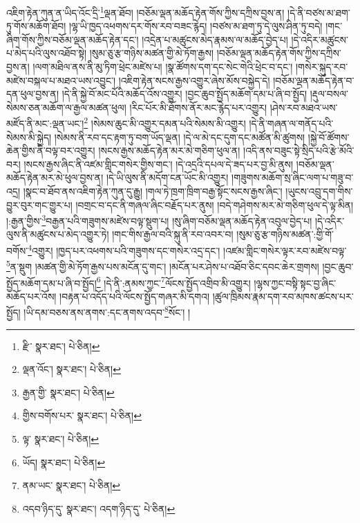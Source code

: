 འཇིག་རྟེན་ཀུན་ན་ཡིད་འོང་དྲི་\footnote{རྫི་  སྣར་ཐང་།  པེ་ཅིན། }ལྡན་ཐོབ། །བཅོམ་ལྡན་མཆོད་རྟེན་གོས་ཀྱིས་དཀྲིས་བྱས་ན། །དེ་ནི་བཙས་མ་ཐག་ཏུ་གོས་མཆོག་ཐོབ། །ལྷ་ཡི་ཁྱད་འཕགས་དར་གོས་རབ་བཟང་རྙེད། །བཙས་མ་ཐག་ཏུ་དེ་ལུས་ཤིན་ཏུ་བདེ། །གང་ཞིག་གོས་ཀྱིས་བཅོམ་ལྡན་མཆོད་རྟེན་དང་། །འདྲེན་པ་མཚུངས་མེད་རྣམས་ལ་མཆོད་བྱེད་པ། །དེ་འདིར་མཚུངས་པ་མེད་པའི་ལུས་འཐོབ་སྟེ། །སུམ་ཅུ་རྩ་གཉིས་མཚན་གྱི་མེ་ཏོག་རྒྱས། །བཅོམ་ལྡན་མཆོད་རྟེན་གོས་ཀྱིས་དཀྲིས་བྱས་ན། །ལག་མཐིལ་ནས་ནི་མུ་ཏིག་ཕྲེང་མཛེས་པ། །སྣ་ཚོགས་དག་དང་སེང་གེའི་ཕྲེང་བ་དང་། །གསེར་སྐུད་རབ་མཛེས་བསྐལ་པ་མཐའ་ཡས་འབྱུང་། །འཇིག་རྟེན་སངས་རྒྱས་འགྱུར་ཞེས་མོས་བསྐྱེད་དེ། །བཅོམ་ལྡན་མཆོད་རྟེན་བ་དན་ཕུལ་བྱས་ན། །དེ་ནི་སྐྱེ་བོ་མང་པོའི་མཆོད་འོས་འགྱུར། །བྱང་ཆུབ་སྤྱོད་མཆོག་དམ་པ་ཞི་བ་སྤྱོད། །རྡུལ་བསལ་སེམས་ཅན་མཆོག་ལ་རྒྱལ་མཚན་ཕུལ། །རིང་པོར་མི་ཐོགས་ནོར་མང་རྙེད་པར་འགྱུར། །ཤེས་རབ་མཐའ་ཡས་མཛོད་ནི་མང་:ལྡན་ཡང་།\footnote{ལྡན་འོང་།  སྣར་ཐང་།  པེ་ཅིན། } །སེམས་ཆུང་མི་འགྱུར་དམན་པའི་སེམས་མི་འགྱུར། །དེ་ནི་གཞན་ལ་གནོད་པའི་སེམས་མི་སྐྱེད། །སེམས་ནི་རབ་དང་རྟག་ཏུ་བག་ཡོད་ལྡན། །དེ་ལ་མེ་དང་དུག་དང་མཚོན་མི་ཚུགས། །སྐྱེ་བོ་ཚོགས་ཆེན་གྱིས་ནི་བལྟ་བར་འགྱུར། །སངས་རྒྱས་མཆོད་རྟེན་མར་མེ་གཅིག་ཕུལ་ན། །འདི་ནས་བཟུང་སྟེ་སྲིད་པའི་རྩེ་མོའི་བར། །སངས་རྒྱས་ཞིང་ནི་འཛམ་གླིང་གསེར་གྱིས་གང་། །དེ་འདྲའི་དཔལ་དེ་ཟད་པར་བྱ་མི་ནུས། །བཅོམ་ལྡན་མཆོད་རྟེན་མར་མེ་ཕུལ་བྱས་ན། །དེ་ཡི་ལུས་ནི་མདོག་ངན་ཡོང་མི་འགྱུར། །གཟུགས་མཆོག་སྲ་ཞིང་ལག་པ་གཟུ་བ་འདྲ། །སྣང་བ་ཐོབ་ནས་འཇིག་རྟེན་ཀུན་དུ་རྒྱུ། །གལ་ཏེ་ཁྲག་ཁྲིག་བརྒྱ་སྟོང་སངས་རྒྱས་ཞིང་། །ཡུངས་འབྲུ་དག་གིས་བྱུར་བུར་གང་གྱུར་པ། །བགྲང་བ་དང་ནི་གཞལ་ཞིང་བརྗོད་པར་ནུས། །བདེ་གཤེགས་མར་མེ་གཅིག་ཕུལ་དེ་ལྟ་མིན། །:རྒྱན་གྱིས་\footnote{རྒྱན་གྱི་  སྣར་ཐང་།  པེ་ཅིན། }བརྒྱན་པའི་གཟུགས་མཛེས་བལྟ་སྡུག་པ། །སུ་ཞིག་བཅོམ་ལྡན་མཆོད་རྟེན་འབུལ་བྱེད་པ། །དེ་འདིར་ལུས་ནི་མཚུངས་པ་མེད་འགྱུར་ཏེ། །གང་གིས་རྒྱལ་བའི་སྐུ་ནི་རབ་འབར་བ། །སུམ་ཅུ་རྩ་གཉིས་མཚན་:གྱི་གོ་བགོས་\footnote{གྱིས་བགོས་པར་  སྣར་ཐང་།  པེ་ཅིན། }འགྱུར། །ཁྱད་པར་འཕགས་པའི་གཟུགས་དང་གསེར་འདྲ་དང་། །འཛམ་གླིང་གསེར་ལྟར་རབ་མཛེས་བལྟ་\footnote{ལྟ་  སྣར་ཐང་།  པེ་ཅིན། }ན་སྡུག །མཚན་གྱི་མེ་ཏོག་རྒྱས་པས་མངོན་དུ་གང་། །མངོན་པར་ཤེས་པ་འཐོབ་ཅིང་དབང་ཆེར་གྲགས། །བྱང་ཆུབ་སྤྱོད་མཆོག་དམ་པ་ཞི་བ་སྤྱོད།\footnote{ཡོད།  སྣར་ཐང་།  པེ་ཅིན། } །དེ་ནི་:ནམས་ཀྱང་\footnote{ནམ་ཡང་  སྣར་ཐང་།  པེ་ཅིན། }ལོངས་སྤྱོད་འགྲིབ་མི་འགྱུར། །ལྷས་ཀྱང་བསྟི་སྟང་བྱ་ཞིང་མཆོད་པར་འོས། །བརྟན་པ་འདོད་པའི་ལོངས་སྤྱོད་གཞར་མི་དགའ། །ཚུལ་ཁྲིམས་རྣམ་དག་རབ་མཁས་ཚངས་པར་སྤྱོད། །ཡི་དམ་བཅས་ནས་ནགས་:དང་ནགས་འདབ་\footnote{འདབ་ཉིད་དུ་  སྣར་ཐང་། འདག་ཉིད་དུ་  པེ་ཅིན། }སོང་། །
